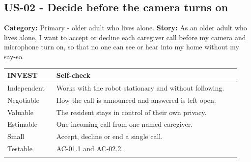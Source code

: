 \documentclass[12pt,letterpaper]{article}
\begin{document}
\par\medskip
\begin{minipage}{\linewidth}
\subsection*{US-02 - Decide before the camera turns on}

\textbf{Category:} Primary - older adult who lives alone. \textbf{Story:} As an older adult who lives alone, I want to accept or decline each caregiver call before my camera and microphone turn on, so that no one can see or hear into my home without my say-so.

\begingroup\small

\begin{tabular}{@{}>{\RaggedRight\arraybackslash}p{0.2\linewidth}>{\RaggedRight\arraybackslash}p{0.75\linewidth}@{}}

\toprule\textbf{INVEST} & \textbf{Self-check}\\\midrule

Independent & Works with the robot stationary and without following. \\ \addlinespace[3pt]

Negotiable & How the call is announced and answered is left open. \\ \addlinespace[3pt]

Valuable & The resident stays in control of their own privacy. \\ \addlinespace[3pt]

Estimable & One incoming call from one named caregiver. \\ \addlinespace[3pt]

Small & Accept, decline or end a single call. \\ \addlinespace[3pt]

Testable & AC-01.1 and AC-02.2. \\ \addlinespace[3pt]

\bottomrule
\end{tabular}

\endgroup
\end{minipage}
\par\medskip
\end{document}
